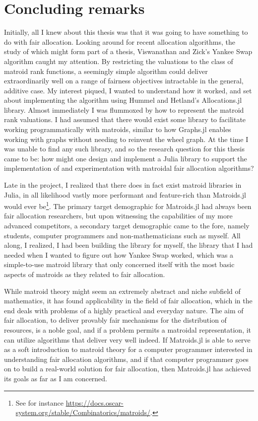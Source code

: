 \section{Concluding remarks}
Initially, all I knew about this thesis was that it was going to have something to do with fair allocation. Looking around for recent allocation algorithms, the study of which might form part of a thesis, Viswanathan and Zick's Yankee Swap algorithm caught my attention. By restricting the valuations to the class of matroid rank functions, a seemingly simple algorithm could deliver extraordinarily well on a range of fairness objectives intractable in the general, additive case. My interest piqued, I wanted to understand how it worked, and set about implementing the algorithm using Hummel and Hetland's Allocations.jl library. Almost immediately I was flummoxed by how to represent the matroid rank valuations. I had assumed that there would exist some library to facilitate working programmatically with matroids, similar to how Graphs.jl enables working with graphs without needing to reinvent the wheel graph. At the time I was unable to find any such library, and so the research question for this thesis came to be: how might one design and implement a Julia library to support the implementation of and experimentation with matroidal fair allocation algorithms? 

Late in the project, I realized that there does in fact exist matroid libraries in Julia, in all likelihood vastly more performant and feature-rich than Matroids.jl would ever be\footnote{See for instance \href{https://docs.oscar-system.org/stable/Combinatorics/matroids/}{https://docs.oscar-system.org/stable/Combinatorics/matroids/}.}. The primary target demographic for Matroids.jl had always been fair allocation researchers, but upon witnessing the capabilities of my more advanced competitors, a secondary target demographic came to the fore, namely students, computer programmers and non-mathematicians such as myself. All along, I realized, I had been building the library for myself, the library that I had needed when I wanted to figure out how Yankee Swap worked, which was a simple-to-use matroid library that only concerned itself with the most basic aspects of matroids as they related to fair  allocation.

While matroid theory might seem an extremely abstract and niche subfield of mathematics, it has found applicability in the field of fair allocation, which in the end deals with problems of a highly practical and everyday nature. The aim of fair allocation, to deliver provably fair mechanisms for the distribution of resources, is a noble goal, and if a problem permits a matroidal representation, it can utilize algorithms that deliver very well indeed. If Matroids.jl is able to serve as a soft introduction to matroid theory for a computer programmer interested in understanding fair allocation algorithms, and if that computer programmer goes on to build a real-world solution for fair allocation, then Matroids.jl has achieved its goals as far as I am concerned.
